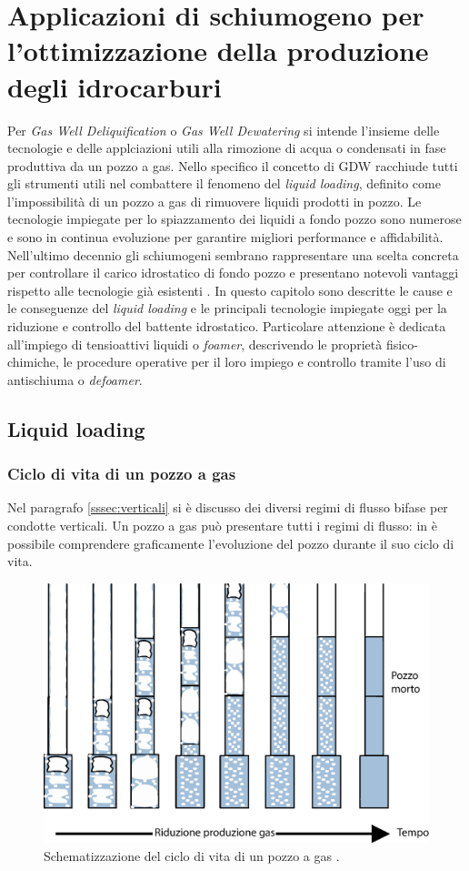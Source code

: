 \clearpage{\pagestyle{empty}\cleardoublepage}
\chapter{Applicazioni di schiumogeno per l'ottimizzazione della produzione degli idrocarburi}
Per \textit{Gas Well Deliquification} o \textit{Gas Well Dewatering} si intende l'insieme delle tecnologie e delle applciazioni utili alla rimozione di acqua o condensati in fase produttiva da un pozzo a gas. Nello specifico il concetto di GDW racchiude tutti gli strumenti utili nel combattere il fenomeno del \textit{liquid loading}, definito come l'impossibilità di un pozzo a gas di rimuovere liquidi prodotti in pozzo. Le tecnologie impiegate per lo spiazzamento dei liquidi a fondo pozzo sono numerose e sono in continua evoluzione per garantire migliori performance e affidabilità. Nell'ultimo decennio gli schiumogeni sembrano rappresentare una scelta concreta per controllare il carico idrostatico di fondo pozzo e presentano notevoli vantaggi rispetto alle tecnologie già esistenti \parencite{stanculescu2014gwd}. In questo capitolo sono descritte le cause e le conseguenze del \textit{liquid loading} e le principali tecnologie impiegate oggi per la riduzione e controllo del battente idrostatico. Particolare attenzione è dedicata all'impiego di tensioattivi liquidi o \textit{foamer}, descrivendo le proprietà fisico-chimiche, le procedure operative per il loro impiego e controllo tramite l'uso di antischiuma o  \textit{defoamer}.

\section{Liquid loading}
\subsection{Ciclo di vita di un pozzo a gas}
Nel paragrafo \ref{sssec:verticali} si è discusso dei diversi regimi di flusso bifase per condotte verticali. Un pozzo a gas può presentare tutti i regimi di flusso: in  è possibile comprendere graficamente l'evoluzione del pozzo durante il suo ciclo di vita.

\begin{figure}[htbp]
    \centering
    \includegraphics[width=.8\textwidth]{fig/foamer/wellhistory.eps}
    \caption{Schematizzazione del ciclo di vita di un pozzo a gas \parencite{lea2011gas}.}
    \label{fig:wellhistory}
\end{figure}

